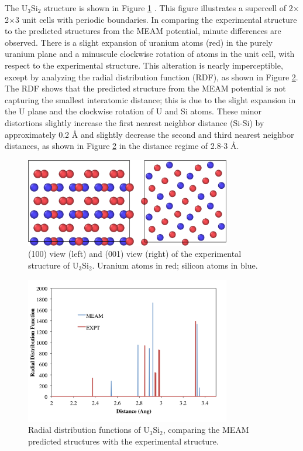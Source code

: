 \documentclass[review]{elsarticle}
\begin{document}
The U$_{3}$Si$_{2}$ structure is shown in Figure \ref{fig:ben1} \cite{zachariasen1949}.  This figure illustrates a supercell of 2$\times$2$\times$3 unit cells with periodic boundaries.  In comparing the experimental structure to the predicted structures from the MEAM potential, minute differences are observed.  There is a slight expansion of uranium atoms (red) in the purely uranium plane and a minuscule clockwise rotation of atoms in the unit cell, with respect to the experimental structure.  This alteration is nearly imperceptible, except by analyzing the radial distribution function (RDF), as shown in Figure \ref{fig:benrdf}.  The RDF shows that the predicted structure from the MEAM potential is not capturing the smallest interatomic distance; this is due to the slight expansion in the U plane and the clockwise rotation of U and Si atoms.  These minor distortions slightly increase the first nearest neighbor distance (Si-Si) by approximately 0.2 {\AA} and slightly decrease the second and third nearest neighbor distances, as shown in Figure \ref{fig:benrdf} in the distance regime of 2.8-3 {\AA}.  

\begin{figure}[ht]
	\centering
	\includegraphics[width=0.8\textwidth]{ben1NEW.png}
    \caption{(100) view (left) and (001) view (right) of the experimental structure of U$_{3}$Si$_{2}$.  Uranium atoms in red; silicon atoms in blue.}\label{fig:ben1}
\end{figure}  

\begin{figure}[ht]
	\centering
	\includegraphics[width=0.8\textwidth]{rdfKK1.png}
    \caption{Radial distribution functions of U$_{3}$Si$_{2}$, comparing the MEAM predicted structures with the experimental structure.}\label{fig:benrdf}
\end{figure}
\end{document}
